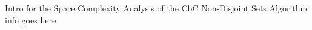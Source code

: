 \documentclass[../../ClusteringConnectionsMAIN.tex]{subfiles}
\begin{document}
\begin{flushleft}
\begin{large}

Intro for the Space Complexity Analysis of the CbC Non-Disjoint Sets Algorithm info goes here


\end{large}
\end{flushleft}
\end{document}
